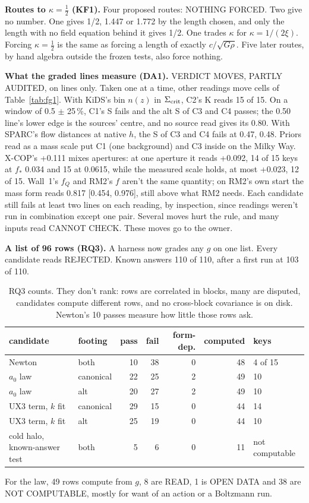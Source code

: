 \documentclass[10pt]{article}
\begin{document}
\textbf{Routes to $\kappa=\tfrac12$ (KF1).} Four proposed routes: NOTHING FORCED. Two give no number. One gives 1/2, 1.447 or 1.772 by the length chosen, and only the length with no field equation behind it gives 1/2. One trades $\kappa$ for $\kappa=1/(2\xi)$. Forcing $\kappa=\tfrac12$ is the same as forcing a length of exactly $c/\sqrt{G\rho}$. Five later routes, by hand algebra outside the frozen tests, also force nothing.

\textbf{What the graded lines measure (DA1).} VERDICT MOVES, PARTLY AUDITED, on lines only. Taken one at a time, other readings move cells of Table~\ref{tab:fg1}. With KiDS's bin $n(z)$ in $\Sigma_{\rm crit}$, C2's K reads 15 of 15. On a window of 0.5 $\pm$ 25\,\%, C1's S fails and the alt S of C3 and C4 passes; the 0.50 line's lower edge is the sources' centre, and no source read gives its 0.80. With SPARC's flow distances at native $h$, the S of C3 and C4 fails at 0.47, 0.48. Priors read as a mass scale put C1 (one background) and C3 inside on the Milky Way. X-COP's +0.111 mixes apertures: at one aperture it reads +0.092, 14 of 15 keys at $f_*$ 0.034 and 15 at 0.0615, while the measured scale holds, at most +0.023, 12 of 15. Wall~1's $f_Q$ and RM2's $f$ aren't the same quantity; on RM2's own start the mass form reads 0.817 [0.454, 0.976], still above what RM2 needs. Each candidate still fails at least two lines on each reading, by inspection, since readings weren't run in combination except one pair. Several moves hurt the rule, and many inputs read CANNOT CHECK. These moves go to the owner.

\textbf{A list of 96 rows (RQ3).} A harness now grades any $g$ on one list. Every candidate reads REJECTED. Known answers 110 of 110, after a first run at 103 of 110.

\begin{table}[h]\centering\small
\caption{RQ3 counts. They don't rank: rows are correlated in blocks, many are disputed, candidates compute different rows, and no cross-block covariance is on disk. Newton's 10 passes measure how little those rows ask.}
\begin{tabular}{llrrrrl}
\toprule
candidate & footing & pass & fail & form-dep. & computed & keys\\
\midrule
Newton & both & 10 & 38 & 0 & 48 & 4 of 15\\
$a_0$ law & canonical & 22 & 25 & 2 & 49 & 10\\
$a_0$ law & alt & 20 & 27 & 2 & 49 & 10\\
UX3 term, $k$ fit & canonical & 29 & 15 & 0 & 44 & 14\\
UX3 term, $k$ fit & alt & 25 & 19 & 0 & 44 & 10\\
cold halo, known-answer test & both & 5 & 6 & 0 & 11 & not computable\\
\bottomrule
\end{tabular}
\end{table}
For the law, 49 rows compute from $g$, 8 are READ, 1 is OPEN DATA and 38 are NOT COMPUTABLE, mostly for want of an action or a Boltzmann run.
\end{document}
